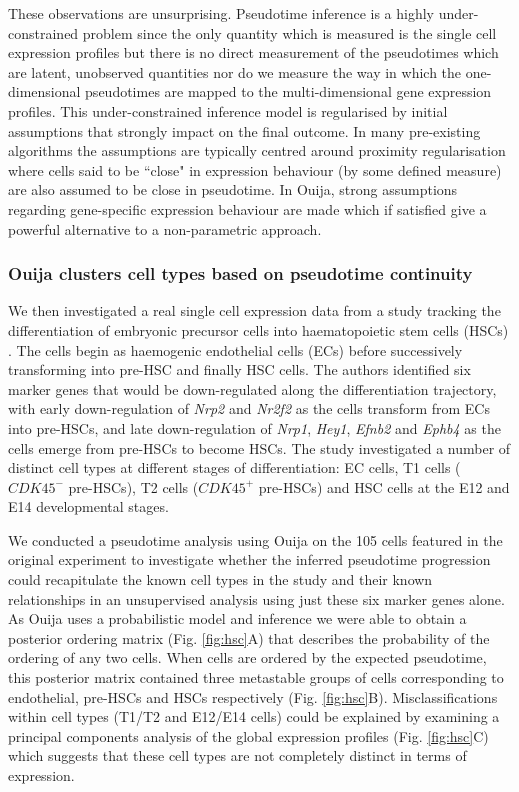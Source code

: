 These observations are unsurprising. Pseudotime inference is a highly under-constrained problem since the only quantity which is measured is the single cell expression profiles but there is no direct measurement of the pseudotimes which are latent, unobserved quantities nor do we measure the way in which the one-dimensional pseudotimes are mapped to the multi-dimensional gene expression profiles. This under-constrained inference model is regularised by initial assumptions that strongly impact on the final outcome. In many pre-existing algorithms the assumptions are typically centred around proximity regularisation where cells said to be ``close" in expression behaviour (by some defined measure) are also assumed to be close in pseudotime. In Ouija, strong assumptions regarding gene-specific expression behaviour are made which if satisfied give a powerful alternative to a non-parametric approach.

\subsubsection{Ouija clusters cell types based on pseudotime continuity}

We then investigated a real single cell expression data from a study tracking the differentiation of embryonic precursor cells into haematopoietic stem cells (HSCs) \cite{zhou2016tracing}. The cells begin as haemogenic endothelial cells (ECs) before successively transforming  into pre-HSC and finally HSC cells. The authors identified six marker genes that would be down-regulated along the differentiation trajectory, with early down-regulation of \emph{Nrp2} and \emph{Nr2f2} as the cells transform from ECs into pre-HSCs, and late down-regulation of \emph{Nrp1}, \emph{Hey1}, \emph{Efnb2} and \emph{Ephb4} as the cells emerge from pre-HSCs to become HSCs. The study investigated a number of distinct cell types at different stages of differentiation: EC cells, T1 cells ($CDK45^-$ pre-HSCs), T2 cells ($CDK45^+$ pre-HSCs) and HSC cells at the E12 and E14 developmental stages.

We conducted a pseudotime analysis using Ouija on the 105 cells featured in the original experiment to investigate whether the inferred pseudotime progression could recapitulate the known cell types in the study and their known relationships in an unsupervised analysis using just these six marker genes alone. As Ouija uses a probabilistic model and inference we were able to obtain a posterior ordering matrix (Fig. \ref{fig:hsc}A) that describes the probability of the ordering of any two cells. When cells are ordered by the expected pseudotime, this posterior matrix contained three metastable groups of cells corresponding to endothelial, pre-HSCs and HSCs respectively (Fig. \ref{fig:hsc}B). Misclassifications within cell types (T1/T2 and E12/E14 cells) could be explained by examining a principal components analysis of the global expression profiles (Fig. \ref{fig:hsc}C) which suggests that these cell types are not completely distinct in terms of expression.

